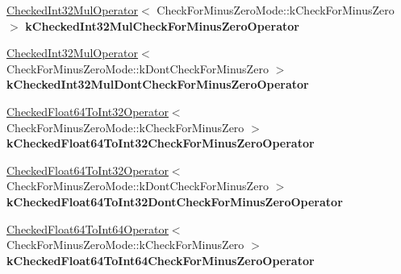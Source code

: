 \begin{DoxyCompactItemize}
\mbox{\hyperlink{structv8_1_1internal_1_1compiler_1_1SimplifiedOperatorGlobalCache_1_1CheckedInt32MulOperator}{Checked\+Int32\+Mul\+Operator}}$<$ Check\+For\+Minus\+Zero\+Mode\+::k\+Check\+For\+Minus\+Zero $>$ {\bfseries k\+Checked\+Int32\+Mul\+Check\+For\+Minus\+Zero\+Operator}
\item 
\mbox{\label{structv8_1_1internal_1_1compiler_1_1SimplifiedOperatorGlobalCache_ae79351eb43e87df3644b1666745c885a}} 
\mbox{\hyperlink{structv8_1_1internal_1_1compiler_1_1SimplifiedOperatorGlobalCache_1_1CheckedInt32MulOperator}{Checked\+Int32\+Mul\+Operator}}$<$ Check\+For\+Minus\+Zero\+Mode\+::k\+Dont\+Check\+For\+Minus\+Zero $>$ {\bfseries k\+Checked\+Int32\+Mul\+Dont\+Check\+For\+Minus\+Zero\+Operator}
\item 
\mbox{\label{structv8_1_1internal_1_1compiler_1_1SimplifiedOperatorGlobalCache_a5b90160a33beb557b0db74d6fb66ced6}} 
\mbox{\hyperlink{structv8_1_1internal_1_1compiler_1_1SimplifiedOperatorGlobalCache_1_1CheckedFloat64ToInt32Operator}{Checked\+Float64\+To\+Int32\+Operator}}$<$ Check\+For\+Minus\+Zero\+Mode\+::k\+Check\+For\+Minus\+Zero $>$ {\bfseries k\+Checked\+Float64\+To\+Int32\+Check\+For\+Minus\+Zero\+Operator}
\item 
\mbox{\label{structv8_1_1internal_1_1compiler_1_1SimplifiedOperatorGlobalCache_ab4b9524228c673551f038e330b026625}} 
\mbox{\hyperlink{structv8_1_1internal_1_1compiler_1_1SimplifiedOperatorGlobalCache_1_1CheckedFloat64ToInt32Operator}{Checked\+Float64\+To\+Int32\+Operator}}$<$ Check\+For\+Minus\+Zero\+Mode\+::k\+Dont\+Check\+For\+Minus\+Zero $>$ {\bfseries k\+Checked\+Float64\+To\+Int32\+Dont\+Check\+For\+Minus\+Zero\+Operator}
\item 
\mbox{\label{structv8_1_1internal_1_1compiler_1_1SimplifiedOperatorGlobalCache_a10911fb4b750d7cbfc3fc532b5a892c2}} 
\mbox{\hyperlink{structv8_1_1internal_1_1compiler_1_1SimplifiedOperatorGlobalCache_1_1CheckedFloat64ToInt64Operator}{Checked\+Float64\+To\+Int64\+Operator}}$<$ Check\+For\+Minus\+Zero\+Mode\+::k\+Check\+For\+Minus\+Zero $>$ {\bfseries k\+Checked\+Float64\+To\+Int64\+Check\+For\+Minus\+Zero\+Operator}
\item 

\end{DoxyCompactItemize}
